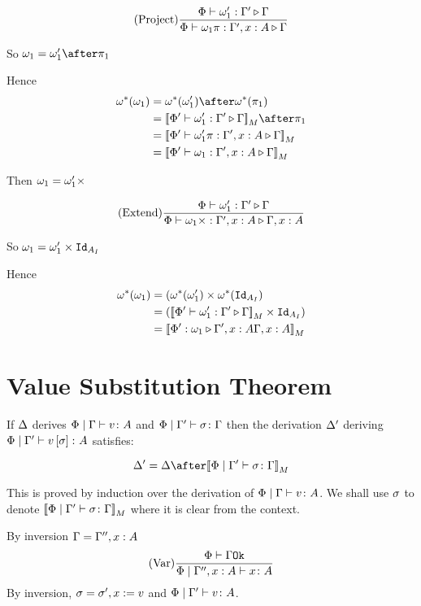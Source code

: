 \documentclass{report}
\begin{document}
\begin{equation}
    (\text{Project}) \frac{\Phi\vdash \omega_1' : \Gamma' \triangleright \Gamma}{\Phi\vdash \omega_1\pi : \Gamma',x:A \triangleright \Gamma}
\end{equation}

So $\w_1 = \w_1'\after\p$

Hence
\begin{align}
    \w\star(\w_1) &= \w\star(\w_1')\after\w\star(\p)\\
    & = \deno{\ewrel{\P'}{\w_1'}{\G'}{\G}}\after\p\\
    & = \deno{\ewrel{\P'}{\w_1'\pi}{\G',x:A}{\G}}\\
    & = \deno{\ewrel{\P'}{\w_1}{\G', x:A}{\G}}
\end{align}

Then $\omega_1 = \omega_1'\times$

\begin{equation}
    (\text{Extend}) \frac{\Phi\vdash \omega_1' : \Gamma' \triangleright \Gamma}{\Phi\vdash \omega_1\times : \Gamma',x:A \triangleright \Gamma, x: A}
\end{equation}

So $\omega_1 = \omega_1'\times\texttt{Id}_{A_I}$

Hence
\begin{align}
    \omega^*(\omega_1) &=(\omega^*(\omega_1')\times\omega^*(\texttt{Id}_{A_I})\\
    & = ({\bf [\![}\Phi'\vdash \omega_1' : \Gamma' \triangleright \Gamma{\bf ]\!]}_M\times\texttt{Id}_{A_I})\\
    & = {\bf [\![}\Phi' : \omega_1 \triangleright \Gamma',x:A{\Gamma, x: A}{\bf ]\!]}_M
\end{align}

\chapter{Value Substitution Theorem}

If $\Delta$ derives $\Phi\mid\Gamma \vdash v \colon A$ and $\Phi\mid\Gamma' \vdash \sigma \colon \Gamma$ then the derivation $\Delta'$ deriving $\Phi\mid\Gamma' \vdash v\left[\sigma\right] \colon A$ satisfies:

\begin{equation}
    \D' = \D \after\deno{\etyperelation{\P}{\G'}{\si}{\G}}
\end{equation}

This is proved by induction over the derivation of $\Phi\mid\Gamma \vdash v \colon A$.
We shall use $\sigma$ to denote ${\bf [\![}\Phi\mid\Gamma' \vdash \sigma \colon \Gamma{\bf ]\!]}_M$ where it is clear from the context.

By inversion $\Gamma = \Gamma'', x:A$
\begin{equation}
    (\text{Var}) \frac{\Phi\vdash \Gamma \texttt{Ok}}{\Phi\mid\Gamma'', x:A \vdash x \colon A}
\end{equation}
By inversion, $\sigma = \sigma', x:= v$ and $\Phi\mid\Gamma' \vdash v \colon A$.
\end{document}
